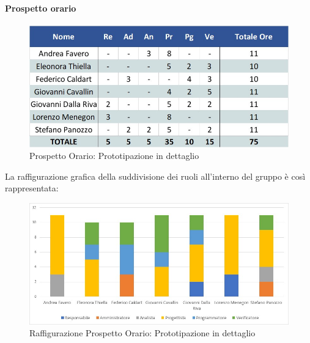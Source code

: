 \paragraph{Prospetto orario}
\begin{figure}[h!]
	\centerline{\includegraphics[scale=0.4]{img/Preventivo/PrototipazioneDettaglioOrario.jpg}}
	\caption{Prospetto Orario: Prototipazione in dettaglio}
\end{figure}
La raffigurazione grafica della suddivisione dei ruoli all'interno del gruppo è così rappresentata: 
\begin{figure}[h!]
	\centerline{\includegraphics[scale=0.4]{img/Preventivo/Istogrammi/PrototipazioneDettaglio.jpg}}
	\caption{Raffigurazione Prospetto Orario: Prototipazione in dettaglio}
\end{figure}

